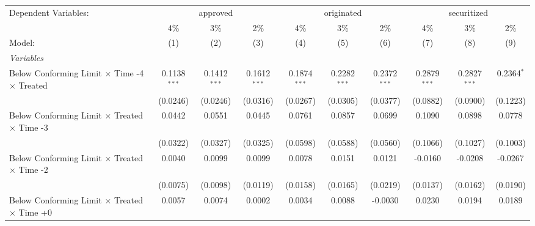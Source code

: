 \begingroup
\centering
\begin{tabular}{lccccccccc}
   \tabularnewline \midrule \midrule
   Dependent Variables: & \multicolumn{3}{c}{approved} & \multicolumn{3}{c}{originated} & \multicolumn{3}{c}{securitized}\\
                                                              & 4\%            & 3\%            & 2\%            & 4\%            & 3\%            & 2\%            & 4\%            & 3\%            & 2\% \\    
   Model:                                                     & (1)            & (2)            & (3)            & (4)            & (5)            & (6)            & (7)            & (8)            & (9)\\  
   \midrule
   \emph{Variables}\\
   Below Conforming Limit $\times$ Time -4 $\times$ Treated   & 0.1138$^{***}$ & 0.1412$^{***}$ & 0.1612$^{***}$ & 0.1874$^{***}$ & 0.2282$^{***}$ & 0.2372$^{***}$ & 0.2879$^{***}$ & 0.2827$^{***}$ & 0.2364$^{*}$\\   
                                                              & (0.0246)       & (0.0246)       & (0.0316)       & (0.0267)       & (0.0305)       & (0.0377)       & (0.0882)       & (0.0900)       & (0.1223)\\   
   Below Conforming Limit $\times$ Treated $\times$ Time -3   & 0.0442         & 0.0551         & 0.0445         & 0.0761         & 0.0857         & 0.0699         & 0.1090         & 0.0898         & 0.0778\\   
                                                              & (0.0322)       & (0.0327)       & (0.0325)       & (0.0598)       & (0.0588)       & (0.0560)       & (0.1066)       & (0.1027)       & (0.1003)\\   
   Below Conforming Limit $\times$ Treated $\times$ Time -2   & 0.0040         & 0.0099         & 0.0099         & 0.0078         & 0.0151         & 0.0121         & -0.0160        & -0.0208        & -0.0267\\   
                                                              & (0.0075)       & (0.0098)       & (0.0119)       & (0.0158)       & (0.0165)       & (0.0219)       & (0.0137)       & (0.0162)       & (0.0190)\\   
   Below Conforming Limit $\times$ Treated $\times$ Time +0   & 0.0057         & 0.0074         & 0.0002         & 0.0034         & 0.0088         & -0.0030        & 0.0230         & 0.0194         & 0.0189\\   

\end{tabular}
